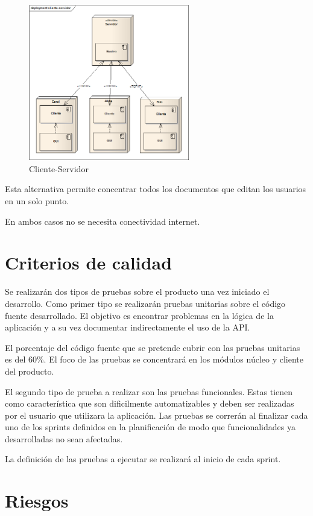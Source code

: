 \documentclass[12pt,a4paper]{article}
\begin{document}
	\begin{figure}[!ht]
		\begin{center}
			\includegraphics[width=7cm]{cliente-servidor.png}
			\caption{\label{server-client} Cliente-Servidor }
		\end{center}
	\end{figure}

Esta alternativa permite concentrar todos los documentos que editan los usuarios en un solo punto.

En ambos casos no se necesita conectividad internet.	

	\section{Criterios de calidad}
	
Se realizarán dos tipos de pruebas sobre el producto una vez iniciado el desarrollo. Como primer tipo se realizarán pruebas unitarias sobre el código fuente desarrollado. El objetivo es encontrar problemas en la lógica de la aplicación y a su vez documentar indirectamente el uso de la API.

	El porcentaje del código fuente que se pretende cubrir con las pruebas unitarias es del 60\%. El foco de las pruebas se concentrará en los módulos núcleo y cliente del producto.

	El segundo tipo de prueba a realizar son las pruebas funcionales. Estas tienen como característica que son dificilmente automatizables y deben ser realizadas por el usuario que utilizara la aplicación. Las pruebas se correrán al finalizar cada uno de los sprints definidos en la planificación de modo que funcionalidades ya desarrolladas no sean afectadas.

La definición de las pruebas a ejecutar se realizará al inicio de cada sprint.

	\section{Riesgos}
\end{document}
